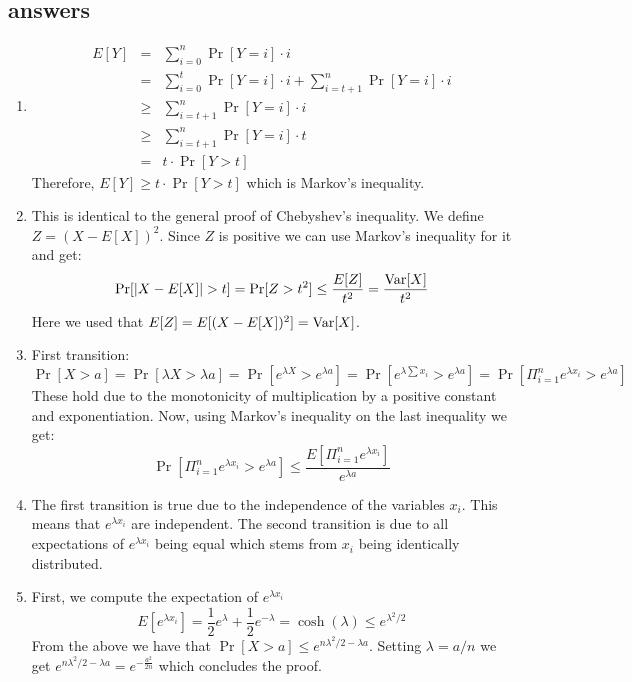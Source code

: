 \documentclass{article}
\begin{document}


\subsection*{answers}
\begin{enumerate}
\item 
\begin{eqnarray*}
E[Y] &=& \sum_{i=0}^{n}\Pr[Y=i]\cdot i\\
&=& \sum_{i=0}^{t}\Pr[Y=i]\cdot i + \sum_{i=t+1}^{n}\Pr[Y=i]\cdot i\\
&\ge& \sum_{i=t+1}^{n}\Pr[Y=i]\cdot i \\
&\ge& \sum_{i=t+1}^{n}\Pr[Y=i]\cdot t \\
&=& t\cdot\Pr[Y > t]
\end{eqnarray*}
Therefore, $E[Y] \ge t\cdot\Pr[Y > t]$ which is Markov's inequality.
\item This is identical to the general proof of Chebyshev's inequality.
We define $Z = (X - E[X])^2$. Since $Z$ is positive we can use Markov's inequality for it and get:
\[
\Pr[|X - E[X]| > t] = \Pr[Z > t^2] \le \frac{E[Z]}{t^2} = \frac{{\operatorname{Var}}[X]}{t^2} 
\]
Here we used that $E[Z] = E[(X - E[X])^2] = {\operatorname{Var}}[X]$.
\item First transition:
\[
\Pr[X > a] = \Pr[\lambda X > \lambda a] = \Pr[e^{\lambda X} > e^{\lambda a}] = \Pr[e^{\lambda \sum x_i} > e^{\lambda a}] = \Pr[\Pi_{i=1}^{n}e^{\lambda x_i} > e^{\lambda a}]
\]
These hold due to the monotonicity of multiplication by a positive constant and exponentiation.
Now, using Markov's inequality on the last inequality we get:
\[
\Pr[\Pi_{i=1}^{n}e^{\lambda x_i} > e^{\lambda a}] \le \frac{E[\Pi_{i=1}^{n}e^{\lambda x_i}]}{e^{\lambda a}} 
\]
\item The first transition is true due to the independence of the variables $x_i$. This means that $e^{\lambda x_i}$ are independent.
The second transition is due to all expectations of $e^{\lambda x_i}$ being equal which stems from $x_i$ being identically distributed.
\item First, we compute the expectation of $e^{\lambda x_i}$ 
\[
E[e^{\lambda x_i}] = \frac{1}{2}e^{\lambda} + \frac{1}{2}e^{-\lambda} = \cosh(\lambda) \le e^{\lambda^2/2}
\]
From the above we have that $\Pr[X > a] \le e^{n\lambda^2/2  - \lambda a}$. Setting $\lambda = a/n$ we get 
$e^{n\lambda^2/2  - \lambda a} = e^{-\frac{a^2}{2n}}$ which concludes the proof.
\end{enumerate}
\pagebreak
\end{document}
